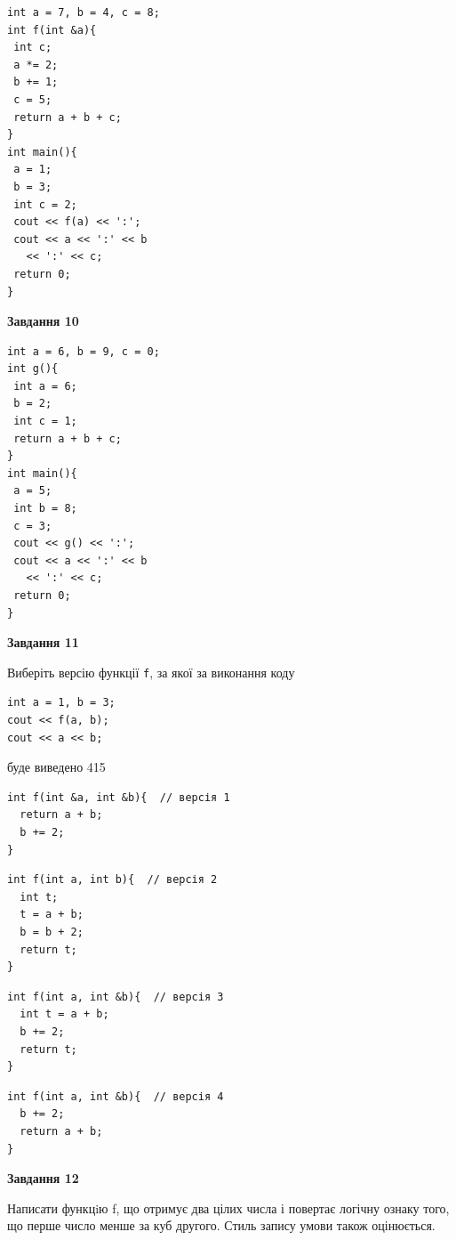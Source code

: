 \documentclass[12pt, ukrainian]{article}
\def\code#1{\Verb!#1!}
\begin{document}
{\begin {large}
\begin{minipage}[t]{7.0cm}
\begin{verbatim}
int a = 7, b = 4, c = 8;
int f(int &a){
 int c;
 a *= 2;
 b += 1;
 c = 5;
 return a + b + c;
}
int main(){
 a = 1;
 b = 3;
 int c = 2;
 cout << f(a) << ':';
 cout << a << ':' << b 
   << ':' << c;
 return 0;
}
\end{verbatim}



\begin{center}
\textbf{Завдання 10}
\end{center}
\vspace{-8mm}

\begin{verbatim}
int a = 6, b = 9, c = 0;
int g(){
 int a = 6;
 b = 2;
 int c = 1;
 return a + b + c;
}
int main(){
 a = 5;
 int b = 8;
 c = 3;
 cout << g() << ':';
 cout << a << ':' << b 
   << ':' << c;
 return 0;
}
\end{verbatim}

\end{minipage}
\vline \hspace{1mm}
\begin{minipage}[t]{11.0cm}

\begin{center}
\textbf{Завдання 11}
\end{center}
Виберіть версію функції \code{f}, за якої за виконання коду
\begin{verbatim}
int a = 1, b = 3;
cout << f(a, b);
cout << a << b;
\end{verbatim}

буде виведено 415

\begin{verbatim}
int f(int &a, int &b){  // версія 1
  return a + b;
  b += 2;
}
\end{verbatim}

\vspace{-8mm}\begin{verbatim}
int f(int a, int b){  // версія 2
  int t;
  t = a + b;
  b = b + 2;
  return t;
}
\end{verbatim}

\vspace{-8mm}\begin{verbatim}
int f(int a, int &b){  // версія 3
  int t = a + b;
  b += 2;
  return t;
}
\end{verbatim}

\vspace{-8mm}\begin{verbatim}
int f(int a, int &b){  // версія 4
  b += 2;
  return a + b;
}
\end{verbatim}



\begin{center}
\textbf{Завдання 12}
\end{center}

Написати функцiю f, що отримує два цілих числа і повертає логічну ознаку того, що перше число менше за куб другого. Стиль запису умови також оцінюється.\par

\end{minipage}

\end {large}}
\end{document}
